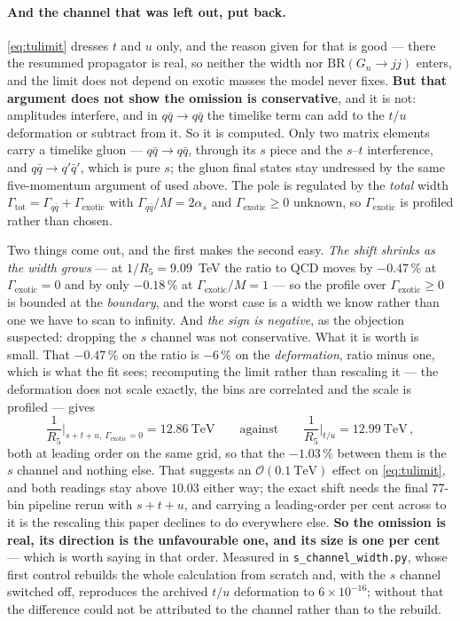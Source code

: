 \documentclass[11pt,a4paper]{article}
\begin{document}
\paragraph{And the channel that was left out, put back.} \eqref{eq:tulimit} dresses $t$ and $u$
only, and the reason given for that is good --- there the resummed propagator is real, so neither
the width nor $\mathrm{BR}(G_n\to jj)$ enters, and the limit does not depend on exotic masses the
model never fixes. \textbf{But that argument does not show the omission is conservative}, and it
is not: amplitudes interfere, and in $q\bar q\to q\bar q$ the timelike term can add to the $t/u$
deformation or subtract from it. So it is computed. Only two matrix elements carry a timelike
gluon --- $q\bar q\to q\bar q$, through its $s$ piece and the $s$--$t$ interference, and
$q\bar q\to q'\bar q'$, which is pure $s$; the gluon final states stay undressed by the same
five-momentum argument of \cite{DMN01} used above. The pole is regulated by the \emph{total} width
$\Gamma_{\mathrm{tot}}=\Gamma_{q\bar q}+\Gamma_{\mathrm{exotic}}$ with
$\Gamma_{q\bar q}/M=2\alpha_s$ and $\Gamma_{\mathrm{exotic}}\ge0$ unknown, so
$\Gamma_{\mathrm{exotic}}$ is profiled rather than chosen.

\noindent Two things come out, and the first makes the second easy. \emph{The shift shrinks as the
width grows} --- at $1/R_5=9.09$~TeV the ratio to QCD moves by $-0.47\,\%$ at
$\Gamma_{\mathrm{exotic}}=0$ and by only $-0.18\,\%$ at $\Gamma_{\mathrm{exotic}}/M=1$ --- so the
profile over $\Gamma_{\mathrm{exotic}}\ge0$ is bounded at the \emph{boundary}, and the worst case
is a width we know rather than one we have to scan to infinity. And \emph{the sign is negative},
as the objection suspected: dropping the $s$ channel was not conservative. What it is worth is
small. That $-0.47\,\%$ on the ratio is $-6\,\%$ on the \emph{deformation}, ratio minus one, which
is what the fit sees; recomputing the limit rather than rescaling it --- the deformation does not
scale exactly, the bins are correlated and the scale is profiled --- gives
\begin{equation}\label{eq:stu}
  \frac{1}{R_5}\Big|_{s+t+u,\ \Gamma_{\mathrm{exotic}}=0}=12.86\ \text{TeV}
  \qquad\text{against}\qquad
  \frac{1}{R_5}\Big|_{t/u}=12.99\ \text{TeV}\,,
\end{equation}
both at leading order on the same grid, so that the $-1.03\,\%$ between them is the $s$ channel and
nothing else. That suggests an $\mathcal{O}(0.1~\text{TeV})$ effect on \eqref{eq:tulimit}, and both
readings stay above $10.03$ either way; the exact shift needs the final $77$-bin pipeline rerun with
$s+t+u$, and carrying a leading-order per cent across to it is the rescaling this paper declines to
do everywhere else.
\textbf{So the omission is real, its direction is the unfavourable one, and its size is one per
cent} --- which is worth saying in that order. Measured in
\texttt{s\_\allowbreak channel\_\allowbreak width.py}, whose first control rebuilds the whole
calculation from scratch and, with the $s$ channel switched off, reproduces the archived $t/u$
deformation to $6\times10^{-16}$; without that the difference could not be attributed to the
channel rather than to the rebuild.
\end{document}
